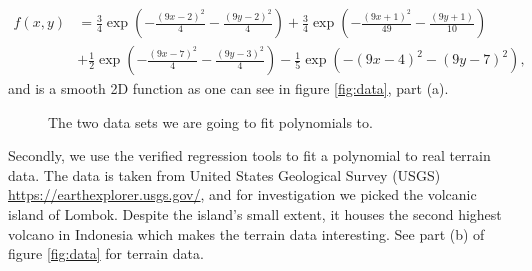 \begin{align*}
f(x,y) &= \frac{3}{4}\exp{\left(-\frac{(9x-2)^2}{4} - \frac{(9y-2)^2}{4}\right)}+\frac{3}{4}\exp{\left(-\frac{(9x+1)^2}{49}- \frac{(9y+1)}{10}\right)} \\
&+\frac{1}{2}\exp{\left(-\frac{(9x-7)^2}{4} - \frac{(9y-3)^2}{4}\right)} -\frac{1}{5}\exp{\left(-(9x-4)^2 - (9y-7)^2\right) },
\end{align*}
and is a smooth 2D function as one can see in figure \eqref{fig:data}, part (a).

 \begin{figure} [H]%
    \centering
    \caption{The two data sets we are going to fit polynomials to.}%
    \label{fig:data}%
 \end{figure}

Secondly, we use the verified regression tools to fit a polynomial to real terrain data. The data is taken from United States Geological Survey (USGS) \url{https://earthexplorer.usgs.gov/}, and for investigation we picked the volcanic island of Lombok. Despite the island's small extent, it houses the second highest volcano in Indonesia which makes the terrain data interesting. See part (b) of figure \eqref{fig:data} for terrain data.

